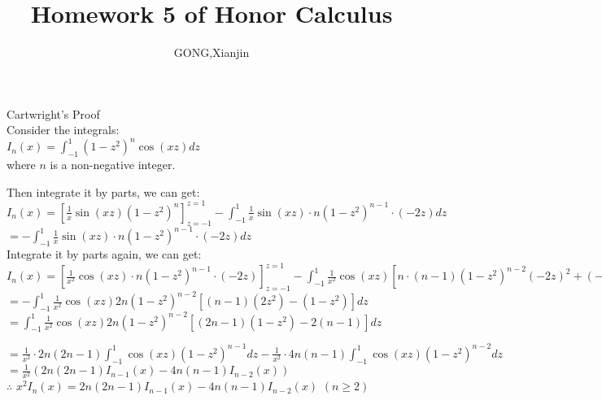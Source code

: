 \documentclass{article}
\author{GONG,Xianjin}
\title{Homework 5 of Honor Calculus}
\begin{document}
\maketitle

\vspace{3.5mm}

\textcolor[rgb]{0.00,0.00,0.50}{Cartwright's Proof}\\

Consider the integrals:\\

$\displaystyle I_{n} (x) = \int_{-1}^1 (1-z^2)^n \cos{(xz)} dz$\\

where $n$ is a non-negative integer.

Then integrate it by parts, we can get:\\

$\displaystyle I_n (x) = \left[\frac{1}{x} \sin{(xz)} (1-z^2)^n\right]_{z = -1}^{z = 1} - \int_{-1}^1 \frac{1}{x} \sin{(xz)} \cdot n(1-z^2)^{n-1} \cdot (-2z) dz$\\

\hskip 0.93cm $\displaystyle = - \int_{-1}^1 \frac{1}{x} \sin{(xz)} \cdot n(1-z^2)^{n-1} \cdot (-2z) dz$\\

Integrate it by parts again, we can get:\\

$\displaystyle I_n(x) = \left[\frac{1}{x^2} \cos{(xz)} \cdot n(1-z^2)^{n-1} \cdot (-2z)\right]_{z = -1}^{z = 1} - \int_{-1}^1 \frac{1}{x^2} \cos{(xz)} \left[n \cdot (n-1) (1-z^2)^{n-2} (-2z)^2 + (-2) n (1-z^2)^{n-1}\right] dz$\\

\hskip 0.93cm $\displaystyle = - \int_{-1}^1 \frac{1}{x^2} \cos{(xz)} 2n(1-z^2)^{n-2} \left[(n-1) (2z^2) - (1-z^2)\right] dz$\\

\hskip 0.93cm $\displaystyle = \int_{-1}^1 \frac{1}{x^2} \cos{(xz)}2n(1-z^2)^{n-2}\left[(2n-1)(1-z^2) - 2(n-1)\right] dz$

\hskip 0.93cm $\displaystyle = \frac{1}{x^2} \cdot 2n(2n-1) \int_{-1}^1 \cos{(xz)} (1-z^2)^{n-1} dz - \frac{1}{x^2} \cdot 4n(n-1) \int_{-1}^1 \cos{(xz)}(1-z^2)^{n-2} dz$\\

\hskip 0.93cm $\displaystyle = \frac{1}{x^2} \left(2n(2n-1) I_{n-1}(x) - 4n(n-1) I_{n-2}(x)\right)$\\

$\therefore$ \qquad $\displaystyle x^2 I_n(x) = 2n(2n-1) I_{n-1}(x) -4n(n-1) I_{n-2}(x)$ \hskip 1.5cm $(n \geq 2)$\\
\end{document}
